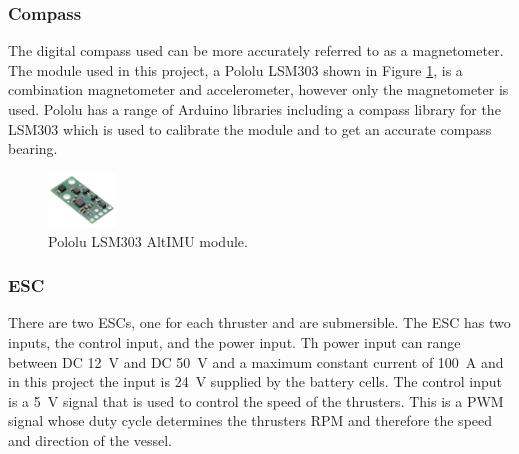 		\subsubsection{Compass}
		The digital compass used can be more accurately referred to as a magnetometer. The module used in this project, a  Pololu LSM303 shown in Figure \ref{fig:3:compass}, is a combination magnetometer and accelerometer, however only the magnetometer is used. Pololu has a range of Arduino libraries including a compass library for the LSM303 which is used to calibrate the module and to get an accurate compass bearing. 
		\begin{figure}[!hb]
			\begin{center}
				\includegraphics[width = 0.16\textwidth]{figures/compass.jpg}
				\caption{Pololu LSM303 AltIMU module.}
				\label{fig:3:compass}
			\end{center}
		\end{figure}
		\subsubsection{ESC}
		There are two ESCs, one for each thruster and are submersible. The ESC has two inputs, the control input, and the power input. Th power input can range between DC \SI{12}{\volt} and DC \SI{50}{\volt} and a maximum constant current of \SI{100}{\ampere} and in this project the input is \SI{24}{\volt} supplied by the battery cells. The control input is a \SI{5}{\volt} signal that is used to control the speed of the thrusters. This is a PWM signal whose duty cycle determines the thrusters RPM and therefore the speed and direction of the vessel. 
